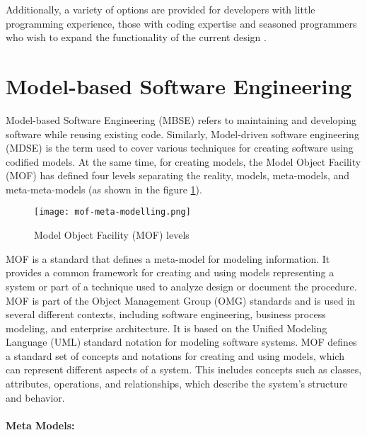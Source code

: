 Additionally, a variety of options are provided for developers with little programming experience, those with coding expertise and seasoned programmers who wish to expand the functionality of the current design \cite{article:nocode:sahina}.
\clearpage
\section{Model-based Software Engineering}
\label{background:section:mbse}
Model-based Software Engineering (MBSE) refers to maintaining and developing software while reusing existing code.
Similarly, Model-driven software engineering (MDSE) is the term used to cover various techniques for creating software using codified models.
At the same time, for creating models, the Model Object Facility (MOF) has defined four levels separating the reality, models, meta-models, and meta-meta-models (as shown in the figure \ref{fig:background:moflevels}).
\begin{figure}[htbp!]
  \centering    
  \texttt{[image: mof-meta-modelling.png]}
  \caption[MOF levels]{Model Object Facility (MOF) levels}
  \label{fig:background:moflevels}
\end{figure}

MOF is a standard that defines a meta-model for modeling information. 
It provides a common framework for creating and using models representing a system or part of a technique used to analyze design or document the procedure.
MOF is part of the Object Management Group (OMG) \cite{misc:mbse:mof} standards and is used in several different contexts, including software engineering, business process modeling, and enterprise architecture. 
It is based on the Unified Modeling Language (UML) standard notation for modeling software systems.
MOF defines a standard set of concepts and notations for creating and using models, which can represent different aspects of a system. 
This includes concepts such as classes, attributes, operations, and relationships, which describe the system's structure and behavior.
\paragraph{Meta Models:} 

